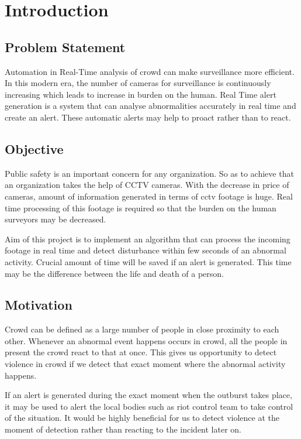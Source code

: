 \chapter{Introduction}

\section{Problem Statement}
Automation in Real-Time analysis of crowd can make surveillance more efficient. In this modern era, the number of cameras for surveillance is continuously increasing which leads to increase in burden on the human. Real Time alert generation is a system that can analyse abnormalities accurately in real time and create an alert. These automatic alerts may help to proact rather than to react. 

\section{Objective}
Public safety is an important concern for any organization. So as to achieve that an organization takes the help of CCTV cameras. With the decrease in price of cameras, amount of information generated in terms of cctv footage is huge. Real time processing of this footage is required so that the burden on the human surveyors may be decreased.
\par
Aim of this project is to implement an algorithm that can process the incoming footage in real time and detect disturbance within few seconds of an abnormal activity. Crucial amount of time will be saved if an alert is generated. This time may be the difference between the life and death of a person.

\section{Motivation}
Crowd can be defined as a large number of people in close proximity to each other. Whenever an abnormal event happens occurs in crowd, all the people in present the crowd react to that at once. This gives us opportunity to  detect violence in crowd if we detect that exact moment where the abnormal activity happens.
\par 
If an alert is generated during the exact moment when the outburst takes place, it may be used to alert the local bodies such as riot control team to take control of the situation. It would be highly beneficial for us to detect violence at the moment of detection rather than reacting to the incident later on.


